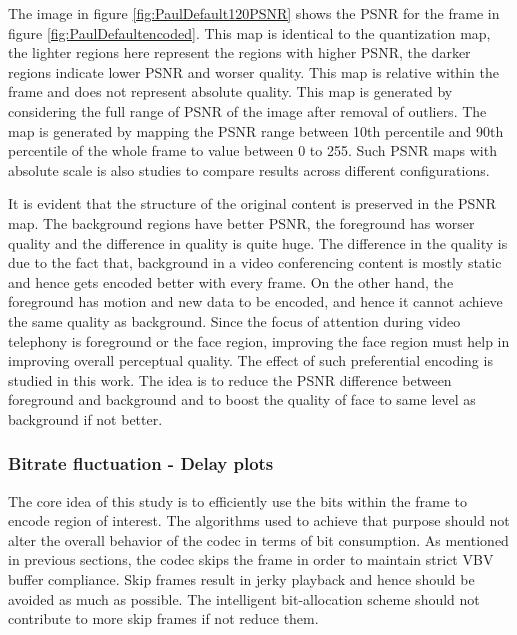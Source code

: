 \documentclass[11pt]{article} %
\begin{document}
The image in figure \ref{fig:PaulDefault120PSNR} shows the PSNR for the frame in figure \ref{fig:PaulDefaultencoded}. This map is identical to the quantization map, the lighter regions here represent the regions with higher PSNR, the darker regions indicate lower PSNR and worser quality. This map is relative within the frame and does not represent  absolute quality. This map is generated by considering the full range of PSNR of the image after removal of outliers. The map is generated by mapping the PSNR range between 10th percentile and 90th percentile of the whole frame to value between 0 to 255. Such PSNR maps with absolute scale is also studies to compare results across different configurations. 

It is evident that the structure of the original content is preserved in the PSNR map. The background regions have better PSNR, the foreground has worser quality and the difference in quality is quite huge. The difference in the quality is due to the fact that, background in a video conferencing content is mostly static and hence gets encoded better with every frame. On the other hand, the foreground has motion and new data to be encoded, and hence it cannot achieve the same quality as background. Since the focus of attention during video telephony is foreground or the face region, improving the face region must help in improving overall perceptual quality. The effect of such preferential encoding is studied in this work. The idea is to reduce the PSNR difference between foreground and background and to boost the quality of face to same level as background if not better.
\subsubsection{Bitrate fluctuation - Delay plots}
The core idea of this study is to efficiently use the bits within the frame to encode region of interest. The algorithms used to achieve that purpose should not alter the overall behavior of the codec in terms of bit consumption. As mentioned in previous sections, the codec skips the frame in order to maintain strict VBV buffer compliance. Skip frames result in jerky playback and hence should be avoided as much as possible. The intelligent bit-allocation scheme should not contribute to more skip frames if not reduce them.
\end{document}
